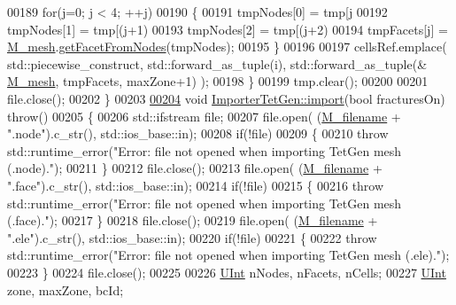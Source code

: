 \begin{DoxyCode}
00189         \textcolor{keywordflow}{for}(j=0; j < 4; ++j)
00190         \{
00191             tmpNodes[0] = tmp[j %
00192             tmpNodes[1] = tmp[(j+1) %
00193             tmpNodes[2] = tmp[(j+2) %
00194             tmpFacets[j] = \hyperlink{classFVCode3D_1_1Importer_a6f1542d6c6ac192e36c8eec7dc366653}{M\_mesh}.\hyperlink{classFVCode3D_1_1Mesh3D_a2ac0b84c13a15ed42cdd8c98066eae98}{getFacetFromNodes}(tmpNodes);
00195         \}
00196 
00197         cellsRef.emplace( std::piecewise\_construct, std::forward\_as\_tuple(i), std::forward\_as\_tuple(&
      \hyperlink{classFVCode3D_1_1Importer_a6f1542d6c6ac192e36c8eec7dc366653}{M\_mesh}, tmpFacets, maxZone+1) );
00198     \}
00199     tmp.clear();
00200 
00201     file.close();
00202 \}
00203 
\hypertarget{Import_8cpp_source.tex_l00204}{}\hyperlink{classFVCode3D_1_1ImporterTetGen_a37d0191b42bbb7af28f5c42acb1185b7}{00204} \textcolor{keywordtype}{void} \hyperlink{classFVCode3D_1_1ImporterTetGen_a37d0191b42bbb7af28f5c42acb1185b7}{ImporterTetGen::import}(\textcolor{keywordtype}{bool} fracturesOn) \textcolor{keywordflow}{throw}()
00205 \{
00206     std::ifstream file;
00207     file.open( (\hyperlink{classFVCode3D_1_1Importer_a318e689fb93c5c906f85aa13685724d7}{M\_filename} + \textcolor{stringliteral}{".node"}).c\_str(), std::ios\_base::in);
00208     \textcolor{keywordflow}{if}(!file)
00209     \{
00210         \textcolor{keywordflow}{throw} std::runtime\_error(\textcolor{stringliteral}{"Error: file not opened when importing TetGen mesh (.node)."});
00211     \}
00212     file.close();
00213     file.open( (\hyperlink{classFVCode3D_1_1Importer_a318e689fb93c5c906f85aa13685724d7}{M\_filename} + \textcolor{stringliteral}{".face"}).c\_str(), std::ios\_base::in);
00214     \textcolor{keywordflow}{if}(!file)
00215     \{
00216         \textcolor{keywordflow}{throw} std::runtime\_error(\textcolor{stringliteral}{"Error: file not opened when importing TetGen mesh (.face)."});
00217     \}
00218     file.close();
00219     file.open( (\hyperlink{classFVCode3D_1_1Importer_a318e689fb93c5c906f85aa13685724d7}{M\_filename} + \textcolor{stringliteral}{".ele"}).c\_str(), std::ios\_base::in);
00220     \textcolor{keywordflow}{if}(!file)
00221     \{
00222         \textcolor{keywordflow}{throw} std::runtime\_error(\textcolor{stringliteral}{"Error: file not opened when importing TetGen mesh (.ele)."});
00223     \}
00224     file.close();
00225 
00226     \hyperlink{namespaceFVCode3D_a4bf7e328c75d0fd504050d040ebe9eda}{UInt} nNodes, nFacets, nCells;
00227     \hyperlink{namespaceFVCode3D_a4bf7e328c75d0fd504050d040ebe9eda}{UInt} zone, maxZone, bcId;

\end{DoxyCode}
